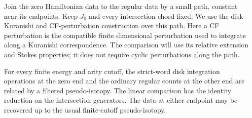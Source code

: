 Join the zero Hamiltonian data to the regular data by a small path,
constant near its endpoints.  Keep $J_0$ and every intersection chord
fixed.  We use the disk Kuranishi and CF-perturbation construction
over this path.  Here a CF perturbation is the compatible finite
dimensional perturbation used to integrate along a Kuranishi
correspondence.  The comparison will use its relative extension and
Stokes properties; it does not require cyclic perturbations along
the path.

\begin{lemma}
\label{comp:pseudoisotopy}
For every finite energy and arity cutoff, the strict-word disk
integration operations at the zero end and the ordinary regular
counts at the other end are related by a filtered pseudo-isotopy.
The linear comparison has the identity reduction on the
intersection generators.  The data at either endpoint may be
recovered up to the usual finite-cutoff pseudo-isotopy.
\end{lemma}

